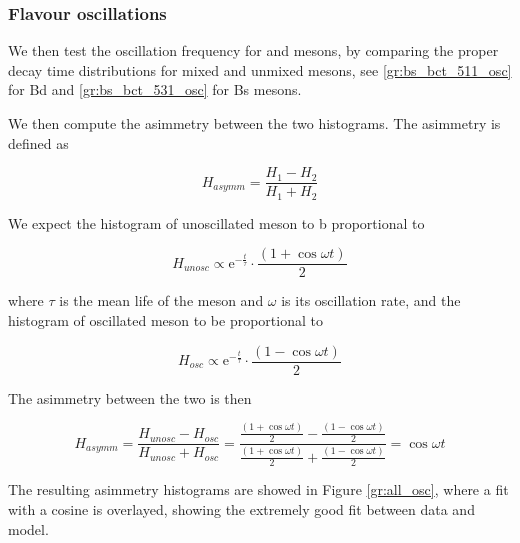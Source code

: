 \subsubsection{Flavour oscillations}
\label{subsubsec:mc_osc}

We then test the oscillation frequency for \PBz and \PsB mesons, by comparing the proper decay time distributions for mixed and unmixed mesons, see \autoref{gr:bs_bct_511_osc} for Bd and \autoref{gr:bs_bct_531_osc} for Bs mesons.


We then compute the asimmetry between the two histograms.
The asimmetry is defined as

\begin{equation}
	H_{asymm} = \frac{H_1-H_2}{H_1+H_2}
	\label{eq:asymm}
\end{equation}

We expect the histogram of unoscillated meson to b proportional to 

\begin{equation}
	H_{unosc} \propto \text{e}^{-\frac{t}{\tau}}\cdot\frac{(1+\cos{\omega t})}{2}
	\label{eq:nosc}
\end{equation}

where $\tau$ is the mean life of the meson and $\omega$ is its oscillation rate, and the histogram of oscillated meson to be proportional to

\begin{equation}
	H_{osc} \propto \text{e}^{-\frac{t}{\tau}}\cdot\frac{(1-\cos{\omega t})}{2}
	\label{eq:yosc}
\end{equation}

The asimmetry between the two is then

\begin{equation}
	H_{asymm} = \frac{H_{unosc}-H_{osc}}{H_{unosc}+H_{osc}} = \frac{\frac{(1+\cos{\omega t})}{2} - \frac{(1-\cos{\omega t})}{2}}{\frac{(1+\cos{\omega t})}{2}+\frac{(1-\cos{\omega t})}{2}} = \cos{\omega t}
	\label{eq:osc_asymm}
\end{equation}

The resulting asimmetry histograms are showed in Figure \ref{gr:all_osc}, where a fit with a cosine is overlayed, showing the extremely good fit between data and model.

